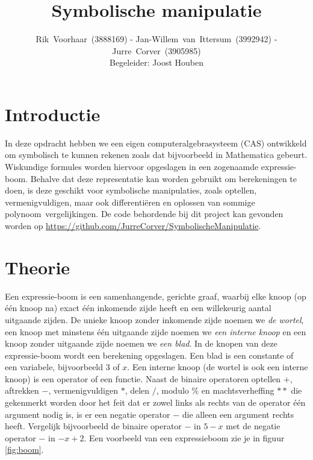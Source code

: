\documentclass[a4paper]{article}
\title{Symbolische manipulatie}
\author{Rik~Voorhaar~(3888169) - Jan-Willem~van~Ittersum~(3992942) - Jurre~Corver~(3905985)\\
Begeleider: Joost Houben}
\begin{document}
\maketitle
\clearpage


\section{Introductie}
In deze opdracht hebben we een eigen computeralgebrasysteem (CAS) ontwikkeld om symbolisch te kunnen rekenen zoals dat bijvoorbeeld in Mathematica gebeurt. Wiskundige formules worden hiervoor opgeslagen in een zogenaamde expressie-boom. Behalve dat deze representatie kan worden gebruikt om berekeningen te doen, is deze geschikt voor symbolische manipulaties, zoals optellen, vermenigvuldigen, maar ook differenti\"eren en oplossen van sommige polynoom~vergelijkingen. De code behordende bij dit project kan gevonden worden op \url{https://github.com/JurreCorver/SymbolischeManipulatie}.


\section{Theorie}
Een expressie-boom is een samenhangende, gerichte graaf, waarbij elke knoop (op \'e\'en knoop na) exact \'e\'en inkomende zijde heeft en een willekeurig aantal uitgaande zijden. De unieke knoop zonder inkomende zijde noemen we \textit{de wortel}, een knoop met minstens \'e\'en uitgaande zijde noemen we \textit{een interne knoop} en een knoop zonder uitgaande zijde noemen we \textit{een blad}. In de knopen van deze expressie-boom wordt een berekening opgeslagen. Een blad is een constante of een variabele, bijvoorbeeld $3$ of $x$. Een interne knoop (de wortel is ook een interne knoop) is een operator of een functie. Naast de binaire operatoren optellen $+$, aftrekken $-$, vermenigvuldigen $*$, delen $/$, modulo $\%$ en machtsverheffing $**$ die gekenmerkt worden door het feit dat er zowel links als rechts van de operator \'e\'en argument nodig is, is er een negatie operator $-$ die alleen een argument rechts heeft. Vergelijk bijvoorbeeld de binaire operator $-$ in $5-x$ met de negatie operator $-$ in $-x+2$. Een voorbeeld van een expressieboom zie je in figuur \ref{fig:boom}.
\end{document}
